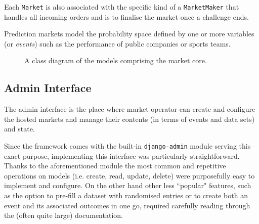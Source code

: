 \documentclass[bsc,frontabs,twoside,singlespacing,parskip,deptreport]{infthesis}     %
\begin{document}
    Each {\tt Market} is also associated with the specific kind of a {\tt MarketMaker} that handles all incoming orders and is to finalise the market once a challenge ends. 
    
    Prediction markets model the probability space defined by one or more variables (or {\em events}) such as the performance of public companies or sports teams. 
    


\begin{figure}
\noindent{}
\label{fig:class_diagram}
\caption{A class diagram of the models comprising the market core. }
\end{figure}


\subsection{Admin Interface}
    The admin interface is the place where market operator can create and configure the hosted markets and manage their contents (in terms of events and data sets) and state. 

	Since the framework comes with the built-in {\tt django-admin} module serving this exact purpose, implementing this interface was particularly straightforward. Thanks to the aforementioned module the most common and repetitive operations on models (i.e. create, read, update, delete) were purposefully easy to implement and configure. On the other hand other less ``popular" features, such as the option to pre-fill a dataset with randomised entries or to create both an event and its associated outcomes in one go, required carefully reading through the (often quite large) documentation.   
\end{document}
